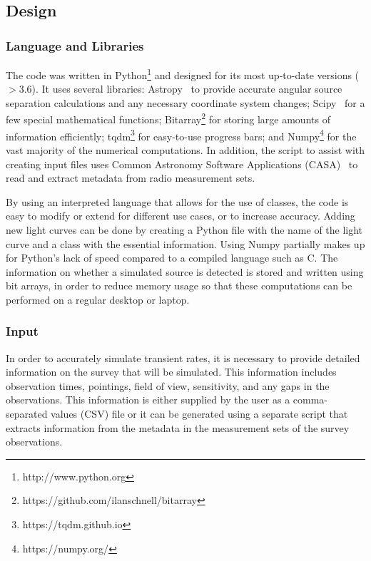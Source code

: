 \documentclass[12pt]{article}
\begin{document}
\subsection{Design}
\label{design}
\subsubsection{Language and Libraries}
The code was written in Python\footnote{http://www.python.org} and designed for its most up-to-date versions ($>3.6$). It uses several libraries: Astropy~\citep{2013A&A...558A..33A} to provide accurate angular source separation calculations and any necessary coordinate system changes; Scipy~\citep{2020NatMe..17..261V} for a few special mathematical functions; Bitarray\footnote{https://github.com/ilanschnell/bitarray} for storing large amounts of information efficiently; tqdm\footnote{https://tqdm.github.io} for easy-to-use progress bars; and Numpy\footnote{https://numpy.org/} for the vast majority of the numerical computations. In addition, the script to assist with creating input files uses Common Astronomy Software Applications (CASA)~\citep{2007ASPC..376..127M} to read and extract metadata from radio measurement sets. 

By using an interpreted language that allows for the use of classes, the code is easy to modify or extend for different use cases, or to increase accuracy. Adding new light curves can be done by creating a Python file with the name of the light curve and a class with the essential information. Using Numpy partially makes up for Python's lack of speed compared to a compiled language such as C. The information on whether a simulated source is detected is stored and written using bit arrays, in order to reduce memory usage so that these computations can be performed on a regular desktop or laptop. 

\subsubsection{Input}
In order to accurately simulate transient rates, it is necessary to provide detailed information on the survey that will be simulated. This information includes observation times, pointings, field of view, sensitivity, and any gaps in the observations. This information is either supplied by the user as a comma-separated values (CSV) file or it can be generated using a separate script that extracts information from the metadata in the measurement sets of the survey observations.
\end{document}
